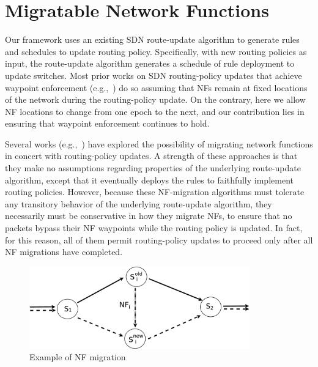 \section{Migratable Network Functions}
\label{sec:migration}

Our framework uses an existing SDN route-update algorithm to generate
rules and schedules to update routing policy.  Specifically, with new
routing policies as input, the route-update algorithm generates a
schedule of rule deployment to update switches.  Most prior works on
SDN routing-policy updates that achieve waypoint enforcement
(e.g.,~\cite{CU, tsu, gnu}) do so assuming that NFs remain at fixed
locations of the network during the routing-policy update.  On the
contrary, here we allow NF locations to change from one epoch to the
next, and our contribution lies in ensuring that waypoint enforcement
continues to hold.

Several works (e.g.,~\cite{split, transfer, swingstate}) have explored
the possibility of migrating network functions in concert with
routing-policy updates.  A strength of these approaches is that they
make no assumptions regarding properties of the underlying
route-update algorithm, except that it eventually deploys the rules to
faithfully implement routing policies.  However, because these
NF-migration algorithms must tolerate any transitory behavior of the
underlying route-update algorithm, they necessarily must be
conservative in how they migrate NFs, to ensure that no packets bypass
their NF waypoints while the routing policy is updated.  In fact, for
this reason, all of them permit routing-policy updates to proceed only
after all NF migrations have completed.

\begin{figure}
\centering
\includegraphics[width=0.85\textwidth]{basicExample.eps}
\vspace{-0.3cm}
\caption{Example of NF migration}
\label{fig:nfexample}
\vspace{-0.5cm}
\end{figure}

